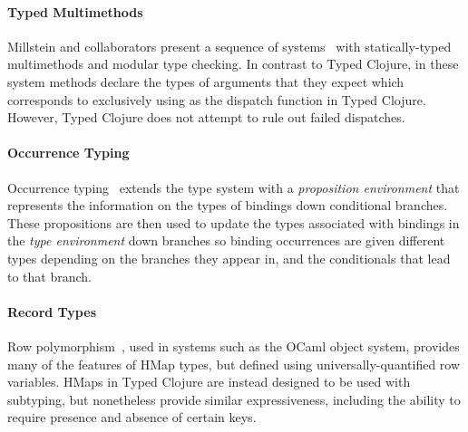 \documentclass[9pt]{extarticle}
\begin{document}
\paragraph{Typed Multimethods} 
Millstein and collaborators present a sequence of
systems~\cite{Chambers:1992:OMC,Chambers:1994:TMM,MS02} with statically-typed multimethods
and modular type checking.  In contrast to Typed Clojure, in these
system methods declare the types of arguments that they expect which
corresponds to exclusively using  as the dispatch function
in Typed Clojure. However, Typed Clojure does not attempt to rule out
failed dispatches.


\paragraph{Occurrence Typing} 
Occurrence typing~\cite{TF08,TF10} extends the type 
system with a \emph{proposition environment} that represents 
the information on the types of bindings down conditional branches.
These propositions are then used to update the types associated
with bindings in the \emph{type environment} down branches
so binding occurrences are given different types 
depending on the branches they appear in, and the conditionals
that lead to that branch.





\paragraph{Record Types} Row polymorphism~\cite{Wand89typeinference,CM91,HP91}, used
in systems such as the OCaml object system, provides many of the
features of HMap types, but defined using universally-quantified row
variables. HMaps in Typed Clojure are instead designed to be used with
subtyping, but nonetheless provide similar expressiveness, including
the ability to require presence and absence of certain keys. 
\end{document}

